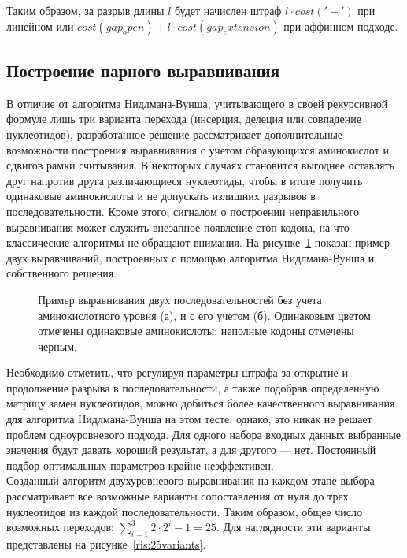 \indent Таким образом, за разрыв длины $l$ будет начислен штраф $l\cdot cost('-')$ при линейном или $cost(gap_open) + l\cdot cost(gap_extension)$ при аффинном подходе.

\subsection[Построение парного выравнивания]{\large Построение парного выравнивания} \label{PairwiseAlign}
\hspace{\parindent} В отличие от алгоритма Нидлмана-Вунша, учитывающего в своей рекурсивной формуле лишь три варианта перехода (инсерция, делеция или совпадение нуклеотидов), разработанное решение рассматривает дополнительные возможности построения выравнивания с учетом образующихся аминокислот и сдвигов рамки считывания. В некоторых случаях становится выгоднее оставлять друг напротив друга различающиеся нуклеотиды, чтобы в итоге получить одинаковые аминокислоты и не допускать излишних разрывов в последовательности. Кроме этого, сигналом о построении неправильного выравнивания может служить внезапное появление стоп-кодона, на что классические алгоритмы не обращают внимания. На рисунке~\ref{ris:NWvsMULTY} показан пример двух выравниваний, построенных с помощью алгоритма Нидлмана-Вунша и собственного решения.

\begin{figure}[h]
	\begin{minipage}[h]{0.49\linewidth}
	\end{minipage}
	\hfill
	\begin{minipage}[h]{0.49\linewidth}
	\end{minipage}
	\caption{Пример выравнивания двух последовательностей без учета аминокислотного уровня (а), и с его учетом (б). Одинаковым цветом отмечены одинаковые аминокислоты; неполные кодоны отмечены черным.}
	\label{ris:NWvsMULTY}
\end{figure}

\indent Необходимо отметить, что регулируя параметры штрафа за открытие и продолжение разрыва в последовательности, а также подобрав определенную матрицу замен нуклеотидов, можно добиться более качественного выравнивания для алгоритма Нидлмана-Вунша на этом тесте, однако, это никак не решает проблем одноуровневого подхода. Для одного набора входных данных выбранные значения будут давать хороший результат, а для другого --- нет. Постоянный подбор оптимальных параметров крайне неэффективен.\\
\indent Созданный алгоритм двухуровневого выравнивания на каждом этапе выбора рассматривает все возможные варианты сопоставления от нуля до трех нуклеотидов из каждой последовательности. Таким образом, общее число возможных переходов: $\sum_{i=1}^3 2\cdot 2^i-1=25$. Для наглядности эти варианты представлены на рисунке~\ref{ris:25variants}. 

